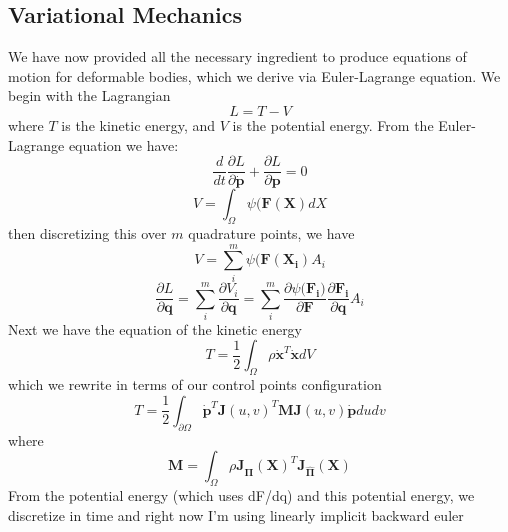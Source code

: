 \subsection{Variational Mechanics}
We have now provided all the necessary ingredient to produce equations of motion for deformable bodies, which we derive via Euler-Lagrange equation. We begin with the Lagrangian
\begin{equation}
    L=T-V
\end{equation}
where $T$ is the kinetic energy, and $V$ is the potential energy. From the Euler-Lagrange equation we have:
\begin{equation}
    \frac{d}{dt} \frac{\partial L}{\partial \dot{\mathbf{p}}} + \frac{\partial L}{\partial {\mathbf{p}}} = 0
\end{equation}
\begin{equation}
    V =  \int_\Omega \psi(\mathbf{F(X)} dX
\end{equation}
then discretizing this over $m$ quadrature points, we have
\begin{equation}
    V =  \sum_i^m \psi(\mathbf{F(X_i)} A_i
\end{equation}
\begin{equation}
    \frac{\partial L}{\partial \mathbf{q}} = \sum_i^m \frac{\partial V_i}{\partial \mathbf{q}} = \sum_i^m \frac{\partial \psi(\mathbf{F_i)}}{\partial \mathbf{F}}\frac{\partial \mathbf{F_i}}{\partial \mathbf{q}}A_i
\end{equation}
Next we have the equation of the kinetic energy
\begin{equation}
    T = \frac{1}{2}\int_{ \Omega} \rho \dot{\mathbf{x}}^T\dot{\mathbf{x}} dV
\end{equation}
which we rewrite in terms of our control points configuration
\begin{equation}
    T = \frac{1}{2} \int_{\partial \Omega} \dot{\mathbf{p}}^T \mathbf{J}(u,v)^T \mathbf{M} \mathbf{J}(u,v) \dot{\mathbf{p}} du dv
\end{equation}
where
\begin{equation}
    \mathbf{M} = \int_\Omega \rho \mathbf{J_{\hat{\Pi}}(X)}^T \mathbf{J_{\hat{\Pi}}(X)}
\end{equation}
From the potential energy (which uses dF/dq) and this potential energy, we discretize in time and right now I'm using linearly implicit backward euler

